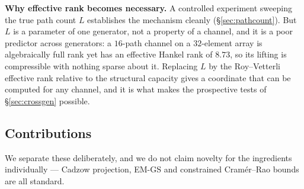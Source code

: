\documentclass[journal]{IEEEtran}
\begin{document}
\textbf{Why effective rank becomes necessary.} A controlled experiment sweeping
the true path count $L$ establishes the mechanism cleanly
(\S\ref{sec:pathcount}). But $L$ is a parameter of one generator, not a
property of a channel, and it is a poor predictor across generators: a
$16$-path channel on a $32$-element array is algebraically full rank yet has an
effective Hankel rank of $8.73$, so its lifting is compressible with nothing
sparse about it. Replacing $L$ by the Roy--Vetterli effective rank
\cite{royvetterli2007} relative to the structural capacity gives a coordinate
that can be computed for any channel, and it is what makes the prospective
tests of \S\ref{sec:crossgen} possible.

\subsection{Contributions}

We separate these deliberately, and we do not claim novelty for the
ingredients individually --- Cadzow projection, EM-GS and constrained
Cram\'er--Rao bounds are all standard.
\end{document}
